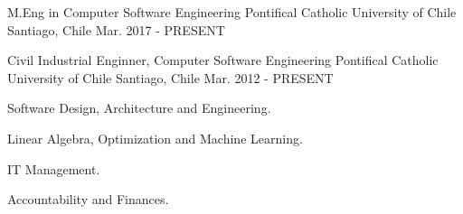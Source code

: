 \begin{cventries}
  \cventry
    {M.Eng in Computer Software Engineering}
    {Pontifical Catholic University of Chile}
    {Santiago, Chile}
    {Mar. 2017 - PRESENT}
    {
      \begin{cvitems}
      \end{cvitems}
    }
  \cventry
    {Civil Industrial Enginner, Computer Software Engineering}
    {Pontifical Catholic University of Chile}
    {Santiago, Chile}
    {Mar. 2012 - PRESENT}
    {
      \begin{cvitems}
        \item {Software Design, Architecture and Engineering.}
        \item {Linear Algebra, Optimization and Machine Learning.}
        \item {IT Management.}
        \item {Accountability and Finances.}
      \end{cvitems}
    }
\end{cventries}
